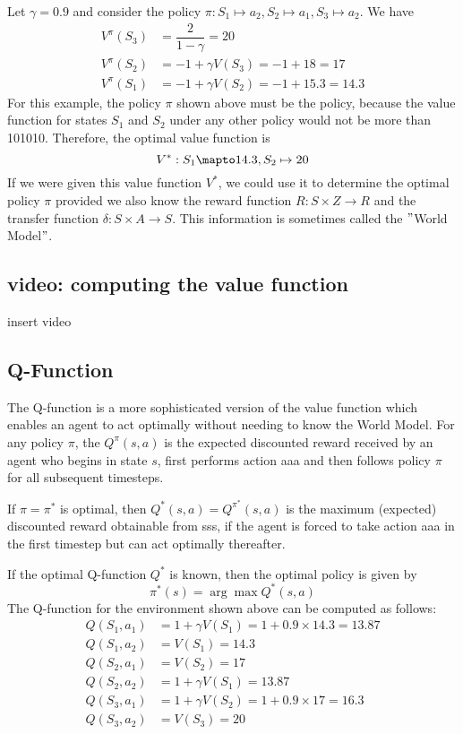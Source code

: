 \documentclass[11pt]{article}
\begin{document}
Let $\gamma = 0.9$ and consider the policy $\pi : S_1 \mapsto a_2 , S_2 \mapsto a_1, S_3 \mapsto a_2$.
We have
\[
\begin{aligned}
V^{\pi} (S_3) &= \dfrac{2}{1 - \gamma} = 20 \\
V^{\pi}(S_2) &= -1 + \gamma V (S_3) = -1 + 18 = 17 \\
V^{\pi}(S_1) &= -1 + \gamma V (S_2) = -1 + 15.3 = 14.3
\end{aligned}
\]
For this example, the policy $\pi$ shown above must be the 
policy, because the value function for states $S_1$ and $S_2$ under any other
policy would not be more than 101010.
Therefore, the optimal value function is
\[V^* : S_1 \mapto 14.3, S_2 \mapsto 20\]
If we were given this value function $V^*$, we could use it to determine the
optimal policy $\pi$ provided we also know the reward function $R: S \times Z \to R$
and the transfer function $\delta : S \times A \to S$.
This information is sometimes called the \("\)World Model\("\).

\subsection{video: computing the value function}\label{subsec:video:-computing-the-value-function}
insert video

\subsection{Q-Function}\label{subsec:q-function}
The Q-function is a more sophisticated version of the value function which
enables an agent to act optimally without needing to know the World Model.
For any policy $\pi$, the  $Q^{\pi} (s,a)$ is the expected
discounted reward received by an agent who begins in state $s$, first performs
action aaa and then follows policy $\pi$ for all subsequent timesteps.

If $\pi = \pi^*$ is optimal, then $Q^* (s,a) = Q^{\pi^*}(s,a)$ is the maximum
(expected) discounted reward obtainable from sss, if the agent is forced to
take action aaa in the first timestep but can act optimally thereafter.

If the optimal Q-function $Q^*$ is known, then the optimal policy is given by
\[\pi^* (s) = \arg \max Q^* (s,a)\]
The Q-function for the environment shown above can be computed as follows:
\[
\begin{aligned}
    Q(S_1, a_1 ) &= 1 + \gamma V(S_1 ) = 1 + 0.9 \times 14.3 = 13.87 \\
    Q(S_1, a_2 ) &= V(S_1 ) = 14.3 \\
    Q(S_2, a_1 ) &= V(S_2) = 17 \\
    Q(S_2, a_2 ) &= 1 + \gamma V(S_1) = 13.87 \\
    Q(S_3, a_1 ) &= 1 + \gamma V(S_2) = 1 + 0.9 \times 17 = 16.3 \\
    Q(S_3, a_2 ) &= V(S_3) = 20
\end{aligned}
\]
\end{document}
